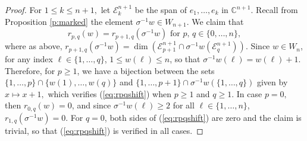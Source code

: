 \documentclass[10pt,a4paper]{amsart}
\newcommand{\C}{\mbox{${\mathbb C}$}}
\newcommand{\Wn}{{W}_n}
\newcommand{\cW}{{ W}}
\begin{document}
\begin{proof}
 For $1\le k \le n+1,$ let ${\mathcal{E}}^{n+1}_{k}$ be the span of $e_1, \dots, e_k$ in $\C^{n+1}.$  Recall from Proposition \ref{p:marked} the element $\sigma^{-1} w \in {\cW}_{n+1}.$  We claim that
\begin{equation}\label{eq:rpqshift}
r_{p,q}(w)=r_{p+1, q}(\sigma^{-1} w)\mbox{ for } p, \, q\in\{0,\dots, n\},
\end{equation}
where as above, $r_{p+1, q}(\sigma^{-1}w)=\dim(\mathcal{E}^{n+1}_{p+1}\cap \sigma^{-1}w(\mathcal{E}^{n+1}_{q})).$  Since $w\in \Wn$, for any index $\ell\in\{1,\dots, q\}$, 
$1\leq w(\ell)\leq n$, so that $\sigma^{-1}w(\ell)=w(\ell)+1$.  
Therefore, for $p\geq 1$, we have a bijection between the sets $\{1,\dots, p\}\cap \{w(1),\dots, w(q)\}$ and $\{1,\dots, p+1\}\cap \sigma^{-1}w (\{1,\dots, q\})$ given by $x\mapsto x+1,$ which verifies (\ref{eq:rpqshift}) when $p \ge 1$ and $q \ge 1.$  In case $p=0,$ then $r_{0,q}(w)=0$, and since $\sigma^{-1}w(\ell)\geq 2$ for all $\ell\in\{1,\dots, n\}$, $r_{1,q}(\sigma^{-1} w)=0.$  For $q=0$, both sides of (\ref{eq:rpqshift}) are zero and the claim is trivial, so that (\ref{eq:rpqshift}) is verified in all cases.   


\end{proof}
\end{document}
